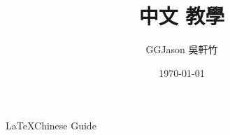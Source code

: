 \documentclass[12pt,a4paper]{article}
\title{中文 \XeLaTeX 教學}
\author{GGJason 吳軒竹}
\date{\today}
\begin{document}
	\maketitle
	\newpage
	{\large \LaTeX Chinese Guide}
\end{document}
